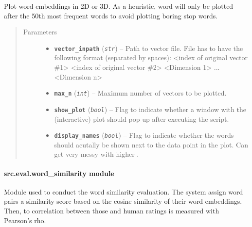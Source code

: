 \documentclass[letterpaper,10pt,english]{sphinxmanual}
\begin{document}
\begin{fulllineitems}
\label{src.eval:src.eval.eval_vectors.plot}
Plot word embeddings in 2D or 3D. As a heuristic, word will only be plotted after the 50th most frequent words to
avoid plotting boring stop words.
\begin{quote}\begin{description}
\item[{Parameters}] \leavevmode\begin{itemize}
\item {} 
\textbf{\texttt{vector\_inpath}} (\emph{\texttt{str}}) -- Path to vector file. File has to have the following format (separated by spaces):
\textless{}index of original vector \#1\textgreater{} \textless{}index of original vector \#2\textgreater{} \textless{}Dimension 1\textgreater{} ... \textless{}Dimension n\textgreater{}

\item {} 
\textbf{\texttt{max\_n}} (\emph{\texttt{int}}) -- Maximum number of vectors to be plotted.

\item {} 
\textbf{\texttt{show\_plot}} (\emph{\texttt{bool}}) -- Flag to indicate whether a window with the (interactive) plot should pop up after executing
the script.

\item {} 
\textbf{\texttt{display\_names}} (\emph{\texttt{bool}}) -- Flag to indicate whether the words should acutally be shown next to the data point in
the plot. Can get very messy with higher .

\end{itemize}

\end{description}\end{quote}

\end{fulllineitems}



\paragraph{src.eval.word\_similarity module}
\label{src.eval:src-eval-word-similarity-module}\label{src.eval:module-src.eval.word_similarity}
Module used to conduct the word similarity evaluation. The system assign word pairs a similarity score based on
the cosine similarity of their word embeddings. Then, to correlation between those and human ratings is measured with
Pearson's rho.
\end{document}
